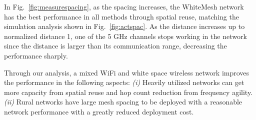 In Fig.~\ref{fig:measurespacing}, as the spacing increases, the WhiteMesh network 
has the best performance in all methods through spatial reuse, matching the simulation 
analysis shown in Fig.~\ref{fig:actspac}. As the distance increases up to normalized 
distance 1, one of the 5 GHz channels stops working in the network since the distance 
is larger than its communication range, decreasing the performance sharply.

Through our analysis, a mixed WiFi and white space wireless network 
improves the performance in the following aspects: 
{\it (i)} Heavily utilized networks can get more capacity from spatial reuse and 
hop count reduction from frequency agility. 
{\it (ii)} Rural networks have large mesh spacing to be deployed with a reasonable network performance 
with a greatly reduced deployment cost.

